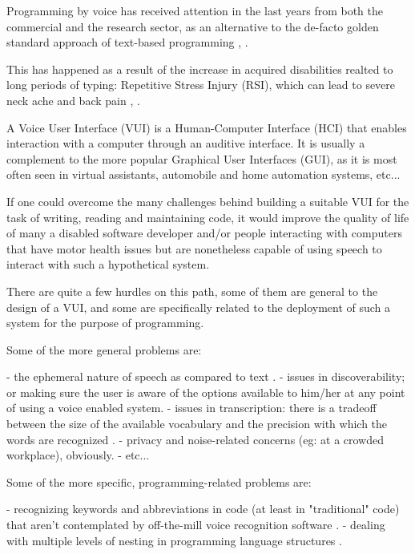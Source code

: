 


Programming by voice has received attention in the last years from both the commercial and the research sector, as an alternative to the de-facto golden standard approach of text-based programming \cite{lagergren2021programming}, 
\cite{arnold2000programming}.

This has happened as a result of the increase in acquired disabilities realted to long periods of typing: Repetitive Stress Injury (RSI), which can lead to severe neck ache and back pain \cite{lagergren2021programming}, \cite{arnold2000programming}.

A Voice User Interface (VUI) is a Human-Computer Interface (HCI) that enables interaction with a computer through an auditive interface. It is usually a complement to the more popular Graphical User Interfaces (GUI), as it is most often seen in virtual assistants, automobile and home automation systems, etc...

If one could overcome the many challenges behind building a suitable VUI for the task of writing, reading and maintaining code, it would improve the quality of life of many a disabled software developer and/or people interacting with computers that have motor health issues but are nonetheless capable of using speech to interact with such a hypothetical system.

There are quite a few hurdles on this path, some of them are general to the design of a VUI, and some are specifically related to the deployment of such a system for the purpose of programming.

Some of the more general problems are:


- the ephemeral nature of speech as compared to text \cite{farinazzo2010empirical}.
- issues in discoverability; or making sure the user is aware of the options available to him/her at any point of using a voice enabled system.
- issues in transcription: there is a tradeoff between the size of the available vocabulary and the precision with which the words are recognized \cite{farinazzo2010empirical}.
- privacy and noise-related concerns (eg: at a crowded workplace), obviously.
- etc...

Some of the more specific, programming-related problems are:

- recognizing keywords and abbreviations in code (at least in "traditional" code) that aren't contemplated by off-the-mill voice recognition software \cite{arnold2000programming}.
- dealing with multiple levels of nesting in programming language structures \cite{arnold2000programming}.

